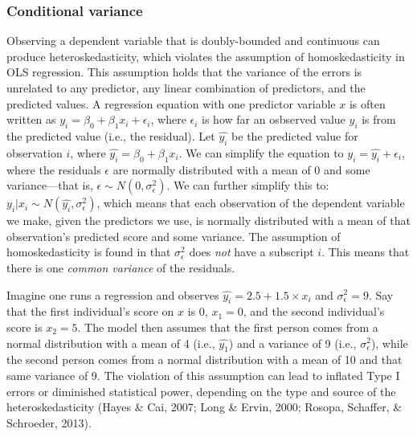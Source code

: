 \documentclass[english,man]{apa6}
\theoremstyle{definition}
\theoremstyle{definition}
\theoremstyle{remark}
\begin{document}
\subsubsection{Conditional variance}\label{conditional-variance}

Observing a dependent variable that is doubly-bounded and continuous can
produce heteroskedasticity, which violates the assumption of
homoskedasticity in OLS regression. This assumption holds that the
variance of the errors is unrelated to any predictor, any linear
combination of predictors, and the predicted values. A regression
equation with one predictor variable \(x\) is often written as
\(y_i = \beta_0 + \beta_1x_i + \epsilon_i\), where \(\epsilon_i\) is how
far an osbserved value \(y_i\) is from the predicted value (i.e., the
residual). Let \(\hat{y_i}\) be the predicted value for observation
\(i\), where \(\hat{y_i} = \beta_0 + \beta_1x_i\). We can simplify the
equation to \(y_i = \hat{y_i} + \epsilon_i\), where the residuals
\(\epsilon\) are normally distributed with a mean of 0 and some
variance---that is, \(\epsilon \sim N(0, \sigma^2_\epsilon)\). We can
further simplify this to:
\(y_i|x_i \sim N(\hat{y_i}, \sigma^2_\epsilon)\), which means that each
observation of the dependent variable we make, given the predictors we
use, is normally distributed with a mean of that observation's predicted
score and some variance. The assumption of homoskedasticity is found in
that \(\sigma^2_\epsilon\) does \emph{not} have a subscript \(i\). This
means that there is one \emph{common variance} of the residuals.

Imagine one runs a regression and observes
\(\hat{y_i} = 2.5 + 1.5 \times x_i\) and \(\sigma^2_\epsilon = 9\). Say
that the first individual's score on \(x\) is 0, \(x_1 = 0\), and the
second individual's score is \(x_2 = 5\). The model then assumes that
the first person comes from a normal distribution with a mean of 4
(i.e., \(\hat{y_1}\)) and a variance of 9 (i.e., \(\sigma^2_\epsilon\)),
while the second person comes from a normal distribution with a mean of
10 and that same variance of 9. The violation of this assumption can
lead to inflated Type I errors or diminished statistical power,
depending on the type and source of the heteroskedasticity (Hayes \&
Cai, 2007; Long \& Ervin, 2000; Rosopa, Schaffer, \& Schroeder, 2013).
\end{document}
